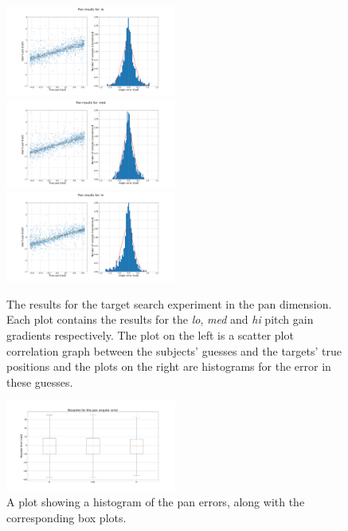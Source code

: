 \documentclass[format=sigconf, review=true, screen=true, anonymous=true]{acmart}
\begin{document}
\begin{figure}
  \centering
  \includegraphics[width=0.5\textwidth]{figures/pan_err_lo.png}
  \includegraphics[width=0.5\textwidth]{figures/pan_err_med.png}
  \includegraphics[width=0.5\textwidth]{figures/pan_err_hi.png}
  \caption{The results for the target search experiment in the pan dimension. Each plot contains the results for the \emph{lo}, \emph{med} and \emph{hi} pitch gain gradients respectively. The plot on the left is a scatter plot correlation graph between the subjects' guesses and the targets' true positions and the plots on the right are histograms for the error in these guesses. }
  \label{fig:pan-err}
\end{figure}

\begin{figure}
  \centering
  \includegraphics[width=0.5\textwidth]{figures/pan_error_boxplot.png}
  \caption{A plot showing a histogram of the pan errors, along with the corresponding box plots. }
  \label{fig:pan-err-hi}
\end{figure}
\end{document}
